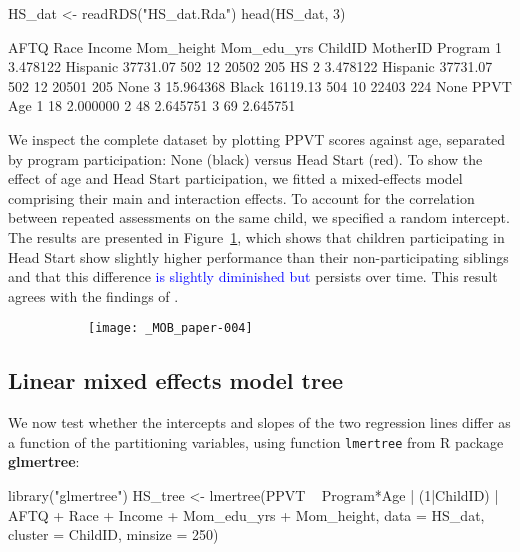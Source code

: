 \documentclass[doc,floatsintext,natbib]{apa7}
\newcommand{\edc}[1]{\textcolor{blue}{#1}}
\begin{document}
\begin{Schunk}
\begin{Sinput}
 HS_dat <- readRDS("HS_dat.Rda")
 head(HS_dat, 3)
\end{Sinput}
\begin{Soutput}
       AFTQ     Race   Income Mom_height Mom_edu_yrs ChildID MotherID Program
1  3.478122 Hispanic 37731.07        502          12   20502      205      HS
2  3.478122 Hispanic 37731.07        502          12   20501      205    None
3 15.964368    Black 16119.13        504          10   22403      224    None
  PPVT      Age
1   18 2.000000
2   48 2.645751
3   69 2.645751
\end{Soutput}
\end{Schunk}

We inspect the complete dataset by plotting PPVT scores against age, separated by program participation: None (black) versus Head Start (red). To show the effect of age and Head Start participation, we fitted a mixed-effects model comprising their main and interaction effects. To account for the correlation between repeated assessments on the same child, we specified a random intercept. The results are presented in Figure~\ref{fig:global_lmm}, which shows that children participating in Head Start show slightly higher performance than their non-participating siblings and that this difference \edc{is slightly diminished but} persists over time. This result agrees with the findings of \cite{Demi09}.

\begin{figure}%
\caption{}
\begin{subfigure}{.7\textwidth}
\texttt{[image: \_MOB\_paper-004]}
\end{subfigure}
\label{fig:global_lmm}
\end{figure}%


\FloatBarrier
\subsection{Linear mixed effects model tree}

We now test whether the intercepts and slopes of the two regression lines differ as a function of the partitioning variables, using function \verb|lmertree| from R package \textbf{glmertree}:

\begin{Schunk}
\begin{Sinput}
 library("glmertree")
 HS_tree <- lmertree(PPVT ~ Program*Age | (1|ChildID) | AFTQ + Race + 
                       Income + Mom_edu_yrs + Mom_height, 
                     data = HS_dat, cluster = ChildID, minsize = 250)
\end{Sinput}
\end{Schunk}
\end{document}
